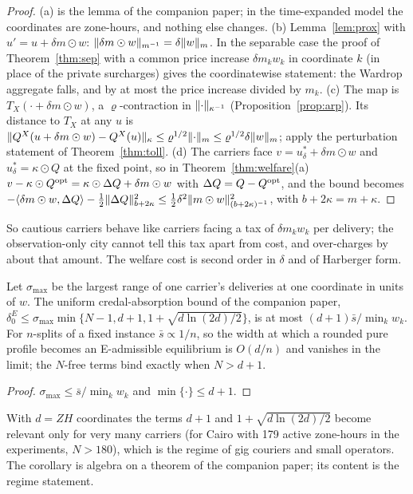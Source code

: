 \begin{proof}
(a) is the lemma of the companion paper; in the time-expanded model the coordinates are zone-hours, and nothing else changes. (b) Lemma~\ref{lem:prox} with $u'=u+\delta m\odot w$: $\lVert \delta m\odot w\rVert_{m^{-1}}=\delta\lVert w\rVert_m$. In the separable case the proof of Theorem~\ref{thm:sep} with a common price increase $\delta m_kw_k$ in coordinate $k$ (in place of the private surcharges) gives the coordinatewise statement: the Wardrop aggregate falls, and by at most the price increase divided by $m_k$. (c) The map is $T_X(\cdot+\delta m\odot w)$, a $\varrho$-contraction in $\lVert \cdot\rVert_{\kappa^{-1}}$ (Proposition~\ref{prop:arp}). Its distance to $T_X$ at any $u$ is $\lVert Q^X(u+\delta m\odot w)-Q^X(u)\rVert_\kappa\le\varrho^{1/2}\lVert \cdot\rVert_m\le\varrho^{1/2}\delta\lVert w\rVert_m$; apply the perturbation statement of Theorem~\ref{thm:toll}. (d) The carriers face $v=u_\delta^*+\delta m\odot w$ and $u_\delta^*=\kappa\odot Q$ at the fixed point, so in Theorem~\ref{thm:welfare}(a) $v-\kappa\odot Q^{\mathrm{opt}}=\kappa\odot\Delta Q+\delta m\odot w$ with $\Delta Q=Q-Q^{\mathrm{opt}}$, and the bound becomes $-\langle \delta m\odot w,\Delta Q\rangle-\tfrac12\lVert \Delta Q\rVert_{b+2\kappa}^2\le\tfrac12\delta^2\lVert m\odot w\rVert_{(b+2\kappa)^{-1}}^2$, with $b+2\kappa=m+\kappa$.
\end{proof}

So cautious carriers behave like carriers facing a tax of $\delta m_kw_k$ per delivery; the observation-only city cannot tell this tax apart from cost, and over-charges by about that amount. The welfare cost is second order in $\delta$ and of Harberger form.

\begin{corollary}\label{cor:width}
Let $\sigma_{\max}$ be the largest range of one carrier's deliveries at one coordinate in units of $w$. The uniform credal-absorption bound of the companion paper, $\delta_0^E\le\sigma_{\max}\min\{N-1,d+1,1+\sqrt{d\ln(2d)/2}\}$, is at most $(d+1)\bar s/\min_kw_k$. For $n$-splits of a fixed instance $\bar s\propto1/n$, so the width at which a rounded pure profile becomes an E-admissible equilibrium is $O(d/n)$ and vanishes in the limit; the $N$-free terms bind exactly when $N>d+1$.
\end{corollary}
\begin{proof}
$\sigma_{\max}\le\bar s/\min_kw_k$ and $\min\{\cdot\}\le d+1$.
\end{proof}

With $d=ZH$ coordinates the terms $d+1$ and $1+\sqrt{d\ln(2d)/2}$ become relevant only for very many carriers (for Cairo with 179 active zone-hours in the experiments, $N>180$), which is the regime of gig couriers and small operators. The corollary is algebra on a theorem of the companion paper; its content is the regime statement.

